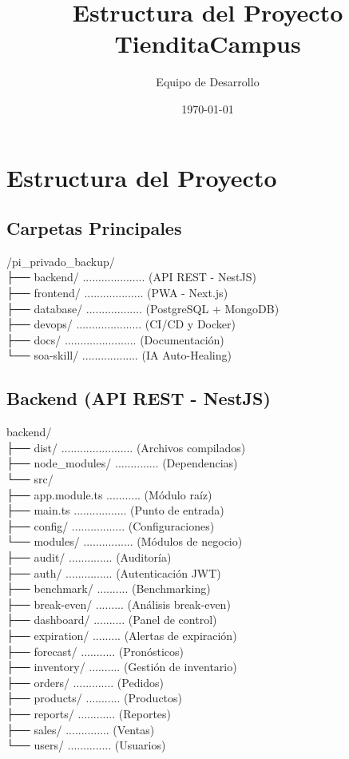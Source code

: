 \documentclass[12pt,a4paper]{article}
\title{\textbf{Estructura del Proyecto TienditaCampus}}
\author{Equipo de Desarrollo}
\date{\today}
\begin{document}
\maketitle

\section{Estructura del Proyecto}

\subsection{Carpetas Principales}
/pi\_privado\_backup/ \\
├── backend/ .................... (API REST - NestJS) \\
├── frontend/ ................... (PWA - Next.js) \\
├── database/ .................. (PostgreSQL + MongoDB) \\
├── devops/ ..................... (CI/CD y Docker) \\
├── docs/ ....................... (Documentaci\'on) \\
└── soa-skill/ .................. (IA Auto-Healing)

\subsection{Backend (API REST - NestJS)}
backend/ \\
├── dist/ ....................... (Archivos compilados) \\
├── node\_modules/ .............. (Dependencias) \\
└── src/ \\
    ├── app.module.ts ........... (M\'odulo ra\'iz) \\
    ├── main.ts ................. (Punto de entrada) \\
    ├── config/ ................. (Configuraciones) \\
    └── modules/ ................ (M\'odulos de negocio) \\
        ├── audit/ .............. (Auditor\'ia) \\
        ├── auth/ ............... (Autenticaci\'on JWT) \\
        ├── benchmark/ .......... (Benchmarking) \\
        ├── break-even/ ......... (An\'alisis break-even) \\
        ├── dashboard/ .......... (Panel de control) \\
        ├── expiration/ ......... (Alertas de expiraci\'on) \\
        ├── forecast/ ........... (Pron\'osticos) \\
        ├── inventory/ .......... (Gesti\'on de inventario) \\
        ├── orders/ ............. (Pedidos) \\
        ├── products/ ........... (Productos) \\
        ├── reports/ ............ (Reportes) \\
        ├── sales/ .............. (Ventas) \\
        └── users/ .............. (Usuarios)
\end{document}
